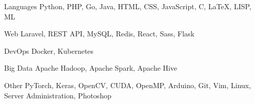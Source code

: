 

\begin{cvskills}

  \cvskill
    {Languages} %
    {Python, PHP, Go, Java, HTML, CSS, JavaScript, C, \LaTeX, LISP, ML} %

  \cvskill
    {Web} %
    {Laravel, REST API, MySQL, Redis, React, Sass, Flask} %

  \cvskill
    {DevOps} %
    {Docker, Kubernetes} %

  \cvskill
    {Big Data} %
    {Apache Hadoop, Apache Spark, Apache Hive} %

  \cvskill
    {Other} %
    {PyTorch, Keras, OpenCV, CUDA, OpenMP, Arduino, Git, Vim, Linux, Server Administration, Photoshop} %

\end{cvskills}
